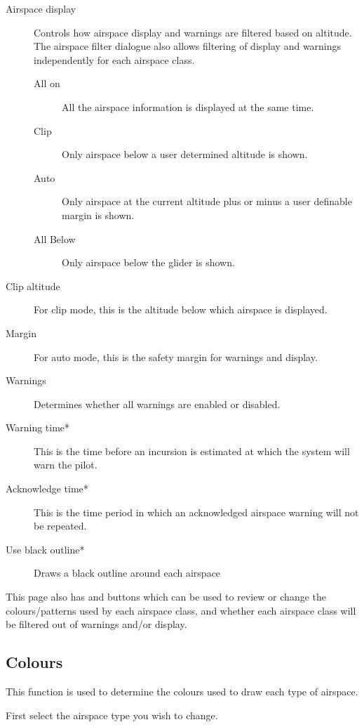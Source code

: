 \begin{description}
\item[Airspace display] Controls how airspace display and warnings are filtered based on altitude.  The airspace filter dialogue also allows filtering
 of display and warnings independently for each airspace class.
\begin{description}
\item[All on] All the airspace information is displayed at the same time.
\item[Clip] Only airspace below a user determined altitude is shown.
\item[Auto] Only airspace at the current altitude plus or minus a user definable margin is shown.
\item[All Below]  Only airspace below the glider is shown.
\end{description}
\item[Clip altitude] For clip mode, this is the altitude below which airspace is displayed.
\item[Margin] For auto mode, this is the safety margin for warnings and display.
\item[Warnings] Determines whether all warnings are enabled or disabled.
\item[Warning time*]  This is the time before an incursion is estimated at
  which the system will warn the pilot.
\item[Acknowledge time*]  This is the time period in which an acknowledged airspace warning will not be repeated.
\item[Use black outline*] Draws a black outline around each airspace
\end{description}

This page also has  and  buttons which
can be used to review or change the colours/patterns used by each
airspace class, and whether each airspace class will be filtered out
of warnings and/or display.  

\subsection*{Colours}
This function is used to determine the colours used to draw each type of
airspace.

First select the airspace type you wish to change.

